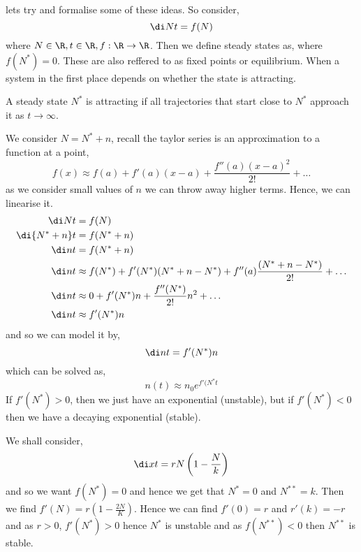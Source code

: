 
lets try and formalise some of these ideas. So consider,
$$ \di N t = f(N) $$
where $N \in \R, t \in \R, f : \R \to \R$. Then we define steady states as, where $f(N^*) = 0$. These are also reffered to as fixed points or equilibrium. When a system in the first place depends on whether the state is attracting.
\begin{ndefi}[Attrracting]
  A steady state $N^*$ is attracting if all trajectories that start close to $N^*$ approach it as $t \to \infty$.
\end{ndefi}

We consider $N = N^* + n$, recall the taylor series is an approximation to a function at a point,
$$ f(x) \approx f(a) + f'(a)(x - a) + \frac{f''(a)(x - a)^2}{2!} + \dots $$
as we consider small values of $n$ we can throw away higher terms. Hence, we can linearise it.
\begin{align*}
  \di N t &= f(N)\\
  \di {N^* + n} t &= f(N^* + n)\\
  \di n t &= f(N^* + n)\\
  \di n t &\approx f(N^*) + f'(N^*)(N^* + n - N^*) + f''(a)\frac{(N^* + n - N^*)}{2!} + \dots\\
  \di n t &\approx 0 + f'(N^*)n + \frac{f''(N^*)}{2!}n^2 + \dots\\
  \di n t &\approx f'(N^*)n
\end{align*}
and so we can model it by,
$$ \di n t = f'(N^*)n $$
which can be solved as,
$$ n(t) \approx n_0e^{f'(N^*t} $$
If $f'(N^*) > 0$, then we just have an exponential (unstable), but if $f'(N^*) < 0$ then we have a decaying exponential (stable).

\begin{eg}
  We shall consider,
  $$ \di x t = rN\left( 1 - \frac{N}{k} \right) $$
  and so we want $f(N^*) = 0$ and hence we get that $N^* = 0$ and $N^{**} = k$. Then we find $f'(N) = r\left(1 - \frac{2N}{K}\right)$. Hence we can find $f'(0) = r$ and $r'(k) = -r$ and as $r > 0$, $f'(N^*) > 0$ hence $N^*$ is unstable and as $f(N^{**}) < 0$ then $N^{**}$ is stable.
\end{eg}
